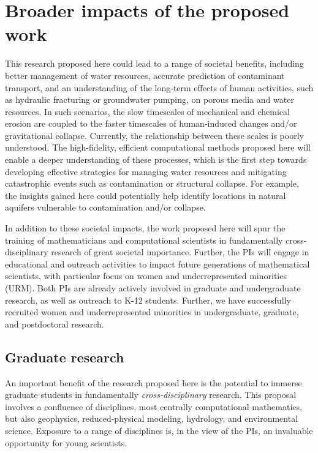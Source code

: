 \documentclass[11pt]{article}
\begin{document}
\section{Broader impacts of the proposed work}

	This research proposed here could lead to a range of societal benefits, including better management of water resources, accurate prediction of contaminant transport, and an understanding of the long-term effects of human activities, such as hydraulic fracturing or groundwater pumping, on porous media and water resources. In such scenarios, the slow timescales of mechanical and chemical erosion are coupled to the faster timescales of human-induced changes and/or gravitational collapse. Currently, the relationship between these scales is poorly understood. The high-fidelity, efficient computational methods proposed here will enable a deeper understanding of these processes, which is the first step towards developing effective strategies for managing water resources and mitigating catastrophic events such as contamination or structural collapse. For example, the insights gained here could potentially help identify locations in natural aquifers vulnerable to contamination and/or collapse.

	In addition to these societal impacts, the work proposed here will spur the training of mathematicians and computational scientists in fundamentally cross-disciplinary research of great societal importance. Further, the PIs will engage in educational and outreach activities to impact future generations of mathematical scientists, with particular focus on women and underrepresented minorities (URM). 
Both PIs are already actively involved in graduate and undergraduate research, as well as outreach to K-12 students. Further, we have successfully recruited women and underrepresented minorities in undergraduate, graduate, and postdoctoral research.

\subsection{Graduate research}

	An important benefit of the research proposed here is the potential to immerse graduate students in fundamentally {\em cross-disciplinary} research. This proposal involves a confluence of disciplines, most centrally computational mathematics, but also geophysics, reduced-physical modeling, hydrology, and environmental science. Exposure to a range of disciplines is, in the view of the PIs, an invaluable opportunity for young scientists.
\end{document}
